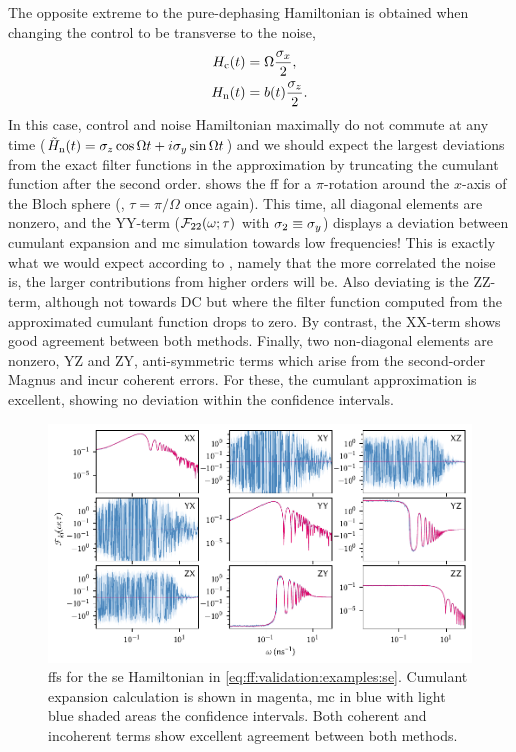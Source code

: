 The opposite extreme to the pure-dephasing Hamiltonian is obtained when changing the control to be transverse to the noise,
\begin{equation}\label{eq:ff:validation:examples:x}
    \begin{split}
        H_{\mathrm{c}}(t) &= \Omega\frac{\sigma_x}{2}, \\
        H_{\mathrm{n}}(t) &= b(t)\frac{\sigma_z}{2}.
    \end{split}
\end{equation}
In this case, control and noise Hamiltonian maximally do not commute at any time ($\tilde{H}_{\mathrm{n}}(t)=\sigma_z\cos\Omega t +i\sigma_y\sin\Omega t$) and we should expect the largest deviations from the exact filter functions in the approximation by truncating the cumulant function after the second order.
 shows the \gls{ff} for a $\pi$-rotation around the $x$-axis of the Bloch sphere (\ie, $\tau = \pi/\Omega$ once again).
This time, all diagonal elements are nonzero, and the YY-term ($\mathcal{F}_{22}(\omega;\tau)$ with $\sigma_2\equiv\sigma_y$) displays a deviation between cumulant expansion and \gls{mc} simulation towards low frequencies!
This is exactly what we would expect according to \citet{Fox1976}, namely that the more correlated the noise is, the larger contributions from higher orders will be.
Also deviating is the ZZ-term, although not towards DC but where the filter function computed from the approximated cumulant function drops to zero.
By contrast, the XX-term shows good agreement between both methods.
Finally, two non-diagonal elements are nonzero, YZ and ZY, anti-symmetric terms which arise from the second-order Magnus and incur coherent errors.
For these, the cumulant approximation is excellent, showing no deviation within the confidence intervals.

\begin{figure}
    \centering
    \includegraphics{img/pdf/filter_functions/monte_carlo_FF_spin_echo}
    \caption[]{
        \Glspl{ff} for the \gls{se} Hamiltonian in \cref{eq:ff:validation:examples:se}.
        Cumulant expansion calculation is shown in magenta, \gls{mc} in blue with light blue shaded areas the confidence intervals.
        Both coherent and incoherent terms show excellent agreement between both methods.
    }
    \label{fig:ff:monte_carlo:se}
\end{figure}

